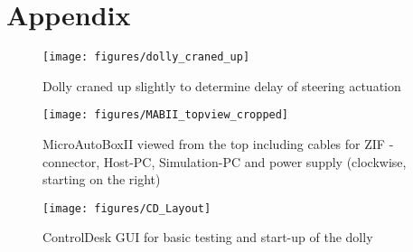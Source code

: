 \documentclass[ExampleMasters.tex]{subfiles}
\begin{document}
\clearpage
{\pagestyle{empty}\cleardoublepage}%

\appendix 
\chapter{Appendix}
\label{chap:Appendix}

\begin{figure*}[h]
\centering
\texttt{[image: figures/dolly\_craned\_up]}
\caption{Dolly craned up slightly to determine delay of steering actuation}
\label{fig:dolly_craned_up}
\end{figure*}

\begin{figure*}[h]
	\centering
	\texttt{[image: figures/MABII\_topview\_cropped]}
	\caption{MicroAutoBoxII viewed from the top including cables for \gls{ZIF} -connector, Host-PC, Simulation-PC and power supply (clockwise, starting on the right)}
	\label{fig:microautobox_topview}
\end{figure*}


\begin{figure*}[h]
	\centering
	\texttt{[image: figures/CD\_Layout]}
	\caption{ControlDesk \gls{GUI} for basic testing and start-up of the dolly}	
	\label{fig:control_desk_GUI}
\end{figure*}
\end{document}
